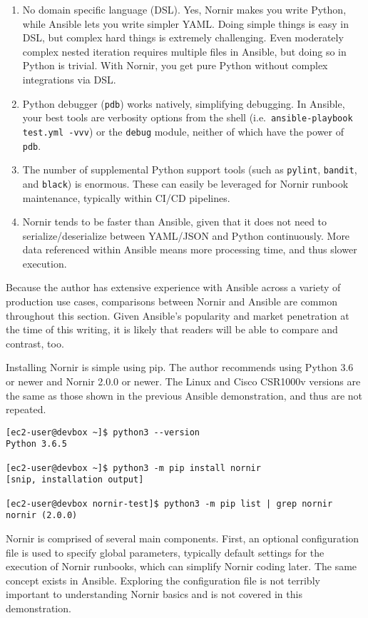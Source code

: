 \begin{enumerate}
  \item	No domain specific language (DSL). Yes, Nornir makes you write Python,
  while Ansible lets you write simpler YAML\@. Doing simple things is easy in
  DSL, but complex hard things is extremely challenging. Even moderately
  complex nested iteration requires multiple files in Ansible, but doing so in
  Python is trivial. With Nornir, you get pure Python without complex
  integrations via DSL\@.
  \item	Python debugger (\verb|pdb|) works natively, simplifying debugging. In
  Ansible, your best tools are verbosity options from the shell (i.e.\
  \verb|ansible-playbook test.yml -vvv|) or the \verb|debug| module, neither
  of which have the power of \verb|pdb|.
  \item	The number of supplemental Python support tools (such as
  \verb|pylint|, \verb|bandit|, and \verb|black|) is enormous. These can
  easily be leveraged for Nornir runbook maintenance, typically within CI/CD pipelines.
  \item	Nornir tends to be faster than Ansible, given that it does not need to
  serialize/deserialize between YAML/JSON and Python continuously. More data
  referenced within Ansible means more processing time, and thus slower execution.
\end{enumerate}

Because the author has extensive experience with Ansible across a variety of
production use cases, comparisons between Nornir and Ansible are common
throughout this section. Given Ansible's popularity and market penetration at
the time of this writing, it is likely that readers will be able to compare
and contrast, too.

Installing Nornir is simple using pip. The author recommends using Python 3.6
or newer and Nornir 2.0.0 or newer. The Linux and Cisco CSR1000v versions are
the same as those shown in the previous Ansible demonstration, and thus are not repeated.

\begin{verbatim}
[ec2-user@devbox ~]$ python3 --version
Python 3.6.5

[ec2-user@devbox ~]$ python3 -m pip install nornir
[snip, installation output]

[ec2-user@devbox nornir-test]$ python3 -m pip list | grep nornir
nornir (2.0.0)
\end{verbatim}

Nornir is comprised of several main components. First, an optional
configuration file is used to specify global parameters, typically default
settings for the execution of Nornir runbooks, which can simplify Nornir
coding later. The same concept exists in Ansible. Exploring the configuration
file is not terribly important to understanding Nornir basics and is not
covered in this demonstration.

